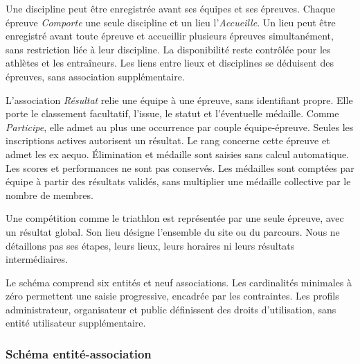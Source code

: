 Une discipline peut être enregistrée avant ses équipes et ses épreuves. Chaque épreuve \emph{Comporte} une seule discipline et un lieu l'\emph{Accueille}. Un lieu peut être enregistré avant toute épreuve et accueillir plusieurs épreuves simultanément, sans restriction liée à leur discipline. La disponibilité reste contrôlée pour les athlètes et les entraîneurs. Les liens entre lieux et disciplines se déduisent des épreuves, sans association supplémentaire.

L'association \emph{Résultat} relie une équipe à une épreuve, sans identifiant propre. Elle porte le classement facultatif, l'issue, le statut et l'éventuelle médaille. Comme \emph{Participe}, elle admet au plus une occurrence par couple équipe-épreuve. Seules les inscriptions actives autorisent un résultat. Le rang concerne cette épreuve et admet les ex aequo. Élimination et médaille sont saisies sans calcul automatique. Les scores et performances ne sont pas conservés. Les médailles sont comptées par équipe à partir des résultats validés, sans multiplier une médaille collective par le nombre de membres.

Une compétition comme le triathlon est représentée par une seule épreuve, avec un résultat global. Son lieu désigne l'ensemble du site ou du parcours. Nous ne détaillons pas ses étapes, leurs lieux, leurs horaires ni leurs résultats intermédiaires.

Le schéma comprend six entités et neuf associations. Les cardinalités minimales à zéro permettent une saisie progressive, encadrée par les contraintes. Les profils administrateur, organisateur et public définissent des droits d'utilisation, sans entité utilisateur supplémentaire.

\par
\endgroup
\clearpage
\subsubsection{Schéma entité-association}
\vspace{0.8em}
\noindent{}
